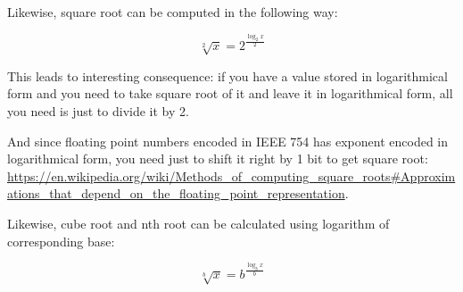 
Likewise, square root can be computed in the following way:

\begin{equation}
\sqrt[2]{x} = 2^{\frac{\log_2{x}}{2}}
\end{equation}

This leads to interesting consequence: if you have a value stored in logarithmical form and you need to take
square root of it and leave it in logarithmical form, all you need is just to divide it by 2.

And since floating point numbers encoded in IEEE 754 has exponent encoded in logarithmical form,
you need just to shift it right by 1 bit to get square root:
\url{https://en.wikipedia.org/wiki/Methods_of_computing_square_roots#Approximations_that_depend_on_the_floating_point_representation}.

Likewise, cube root and nth root can be calculated using logarithm of corresponding base:

\begin{equation}
\sqrt[b]{x} = b^{\frac{\log_b{x}}{b}}
\end{equation}

